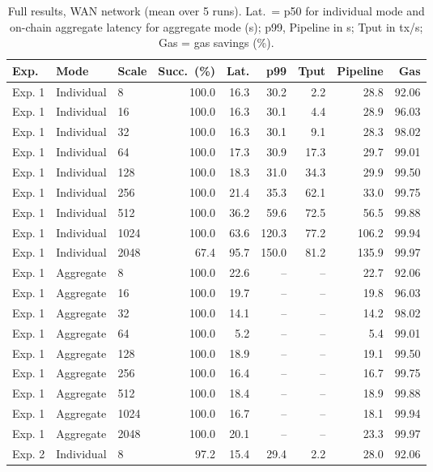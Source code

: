 \begin{table}[!t]
\centering
\scriptsize
\caption{Full results, WAN network (mean over 5 runs). Lat.\ = p50 for individual mode and on-chain aggregate latency for aggregate mode (s); p99, Pipeline in s; Tput in tx/s; Gas = gas savings (\%).}
\label{tab:full-wan}
\begin{tabular}{@{}lllrrrrrr@{}}
\toprule
Exp. & Mode & Scale & Succ.\ (\%) & Lat. & p99 & Tput & Pipeline & Gas \\
\midrule
Exp. 1 & Individual & 8 & 100.0 & 16.3 & 30.2 & 2.2 & 28.8 & 92.06 \\
Exp. 1 & Individual & 16 & 100.0 & 16.3 & 30.1 & 4.4 & 28.9 & 96.03 \\
Exp. 1 & Individual & 32 & 100.0 & 16.3 & 30.1 & 9.1 & 28.3 & 98.02 \\
Exp. 1 & Individual & 64 & 100.0 & 17.3 & 30.9 & 17.3 & 29.7 & 99.01 \\
Exp. 1 & Individual & 128 & 100.0 & 18.3 & 31.0 & 34.3 & 29.9 & 99.50 \\
Exp. 1 & Individual & 256 & 100.0 & 21.4 & 35.3 & 62.1 & 33.0 & 99.75 \\
Exp. 1 & Individual & 512 & 100.0 & 36.2 & 59.6 & 72.5 & 56.5 & 99.88 \\
Exp. 1 & Individual & 1024 & 100.0 & 63.6 & 120.3 & 77.2 & 106.2 & 99.94 \\
Exp. 1 & Individual & 2048 & 67.4 & 95.7 & 150.0 & 81.2 & 135.9 & 99.97 \\
\addlinespace[2pt]
Exp. 1 & Aggregate & 8 & 100.0 & 22.6 & -- & -- & 22.7 & 92.06 \\
Exp. 1 & Aggregate & 16 & 100.0 & 19.7 & -- & -- & 19.8 & 96.03 \\
Exp. 1 & Aggregate & 32 & 100.0 & 14.1 & -- & -- & 14.2 & 98.02 \\
Exp. 1 & Aggregate & 64 & 100.0 & 5.2 & -- & -- & 5.4 & 99.01 \\
Exp. 1 & Aggregate & 128 & 100.0 & 18.9 & -- & -- & 19.1 & 99.50 \\
Exp. 1 & Aggregate & 256 & 100.0 & 16.4 & -- & -- & 16.7 & 99.75 \\
Exp. 1 & Aggregate & 512 & 100.0 & 18.4 & -- & -- & 18.9 & 99.88 \\
Exp. 1 & Aggregate & 1024 & 100.0 & 16.7 & -- & -- & 18.1 & 99.94 \\
Exp. 1 & Aggregate & 2048 & 100.0 & 20.1 & -- & -- & 23.3 & 99.97 \\
\addlinespace[2pt]
Exp. 2 & Individual & 8 & 97.2 & 15.4 & 29.4 & 2.2 & 28.0 & 92.06 \\

\end{tabular}
\end{table}
